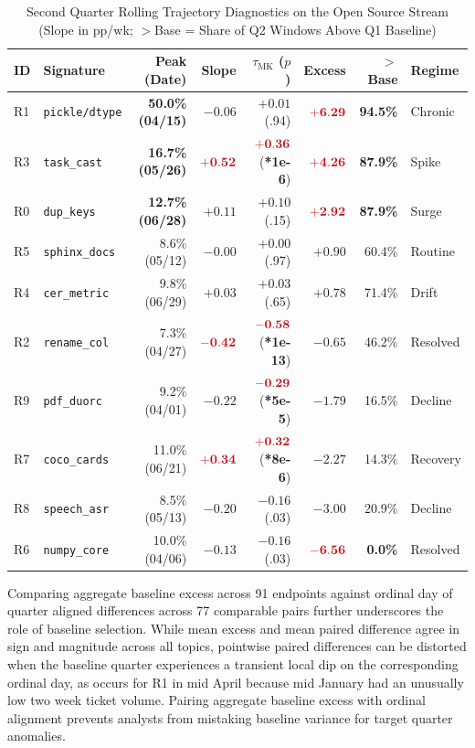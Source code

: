 \documentclass[sigconf,anonymous,pbalance]{acmart}
\newcommand{\hl}[1]{\textcolor{hlred}{\mathbf{#1}}}
\newcommand{\hlt}[1]{\textcolor{hlred}{\textbf{#1}}}
\begin{document}
\begin{table}[!htbp]
  \caption{Second Quarter Rolling Trajectory Diagnostics on the Open Source Stream (Slope in pp/wk; $>$Base = Share of Q2 Windows Above Q1 Baseline)}
  \label{tab:q2traj}
  \footnotesize
  \setlength{\tabcolsep}{1.4pt}
  \begin{tabular}{llrrrrrl}
    \toprule
    ID & Signature & Peak (Date) & Slope & $\tau_{\text{MK}}$ ($p$) & Excess & $>$Base & Regime \\
    \midrule
    R1 & \texttt{pickle/dtype} & \hlt{50.0\% (04/15)} & $-0.06$ & $+0.01$ (.94) & $\hl{+6.29}$ & \hlt{94.5\%} & Chronic \\
    R3 & \texttt{task\_cast} & \hlt{16.7\% (05/26)} & $\hl{+0.52}$ & $\hl{+0.36}$ (\hlt{*1e-6}) & $\hl{+4.26}$ & \hlt{87.9\%} & Spike \\
    R0 & \texttt{dup\_keys} & \hlt{12.7\% (06/28)} & $+0.11$ & $+0.10$ (.15) & $\hl{+2.92}$ & \hlt{87.9\%} & Surge \\
    R5 & \texttt{sphinx\_docs} & 8.6\% (05/12) & $-0.00$ & $+0.00$ (.97) & $+0.90$ & 60.4\% & Routine \\
    R4 & \texttt{cer\_metric} & 9.8\% (06/29) & $+0.03$ & $+0.03$ (.65) & $+0.78$ & 71.4\% & Drift \\
    R2 & \texttt{rename\_col} & 7.3\% (04/27) & $\hl{-0.42}$ & $\hl{-0.58}$ (\hlt{*1e-13}) & $-0.65$ & 46.2\% & Resolved \\
    R9 & \texttt{pdf\_duorc} & 9.2\% (04/01) & $-0.22$ & $\hl{-0.29}$ (\hlt{*5e-5}) & $-1.79$ & 16.5\% & Decline \\
    R7 & \texttt{coco\_cards} & 11.0\% (06/21) & $\hl{+0.34}$ & $\hl{+0.32}$ (\hlt{*8e-6}) & $-2.27$ & 14.3\% & Recovery \\
    R8 & \texttt{speech\_asr} & 8.5\% (05/13) & $-0.20$ & $-0.16$ (.03) & $-3.00$ & 20.9\% & Decline \\
    R6 & \texttt{numpy\_core} & 10.0\% (04/06) & $-0.13$ & $-0.16$ (.03) & $\hl{-6.56}$ & \hlt{0.0\%} & Resolved \\
    \bottomrule
  \end{tabular}
\end{table}

Comparing aggregate baseline excess across 91 endpoints against ordinal day of quarter aligned differences across 77 comparable pairs further underscores the role of baseline selection. While mean excess and mean paired difference agree in sign and magnitude across all topics, pointwise paired differences can be distorted when the baseline quarter experiences a transient local dip on the corresponding ordinal day, as occurs for R1 in mid April because mid January had an unusually low two week ticket volume. Pairing aggregate baseline excess with ordinal alignment prevents analysts from mistaking baseline variance for target quarter anomalies.
\end{document}
